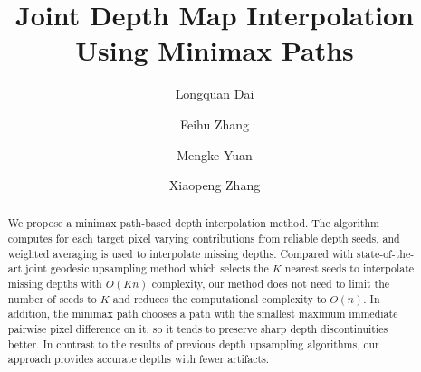 \documentclass[preprint,10pt,5p,times,twocolumn]{elsarticle}
\begin{document}
\graphicspath{{figure/}}

\begin{frontmatter}



\title{Joint Depth Map Interpolation Using Minimax Paths}


\author[nlpr]{Longquan Dai}

\author[nlpr]{Feihu Zhang}

\author[nlpr]{Mengke Yuan}

\author[nlpr]{Xiaopeng Zhang}

\address[nlpr]{ National Laboratory of Pattern Recognition\\ Institute of Automation Chinese Academy of Sciences\\95 Zhongguancun East Road Beijing China}


\begin{abstract}
We propose a minimax path-based depth interpolation method. The algorithm computes for each target pixel varying contributions from reliable depth seeds, and weighted averaging is used to interpolate missing depths. Compared with state-of-the-art joint geodesic upsampling method which selects the $K$ nearest seeds to interpolate missing depths with $O(Kn)$ complexity, our method does not need to limit the number of seeds to $K$ and reduces the computational complexity to $O(n)$. In addition, the minimax path chooses a path with the smallest maximum immediate pairwise pixel difference on it, so it tends to preserve sharp depth discontinuities better. In contrast to the results of previous depth upsampling algorithms, our approach provides accurate depths with fewer artifacts.
\end{abstract}


\end{frontmatter}
\end{document}

